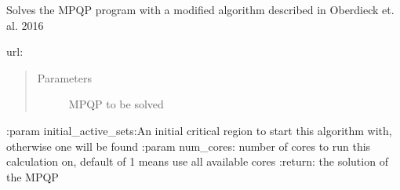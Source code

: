 \documentclass[letterpaper,10pt,english]{sphinxmanual}
\begin{document}
\begin{fulllineitems}
\label{\detokenize{ppopt.mp_solvers:ppopt.mp_solvers.mpqp_parrallel_graph.solve}}
\sphinxAtStartPar
Solves the MPQP program with a modified algorithm described in Oberdieck et. al. 2016

\sphinxAtStartPar
url: 
\begin{quote}\begin{description}
\item[{Parameters}] \leavevmode
\sphinxAtStartPar
{} \textendash{} MPQP to be solved

\end{description}\end{quote}

\sphinxAtStartPar
:param initial\_active\_sets:An initial critical region to start this algorithm with, otherwise one will be found
:param num\_cores: number of cores to run this calculation on, default of \sphinxhyphen{}1 means use all available cores
:return: the solution of the MPQP

\end{fulllineitems}

\end{document}
